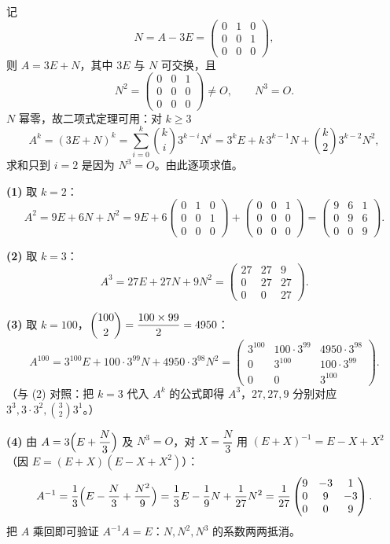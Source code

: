 \begin{solution}
记
\[
N=A-3E=\begin{pmatrix}0&1&0\\0&0&1\\0&0&0\end{pmatrix},
\]
则 $A=3E+N$，其中 $3E$ 与 $N$ 可交换，且
\[
N^{2}=\begin{pmatrix}0&0&1\\0&0&0\\0&0&0\end{pmatrix}\ne O,\qquad N^{3}=O .
\]
$N$ 幂零，故二项式定理可用：对 $k\ge3$
\[
A^{k}=(3E+N)^{k}=\sum_{i=0}^{k}\binom{k}{i}3^{k-i}N^{i}
=3^{k}E+k\,3^{k-1}N+\binom{k}{2}3^{k-2}N^{2},
\]
求和只到 $i=2$ 是因为 $N^{3}=O$。由此逐项求值。

\textbf{(1)} 取 $k=2$：
\[
A^{2}=9E+6N+N^{2}=9E+6\begin{pmatrix}0&1&0\\0&0&1\\0&0&0\end{pmatrix}+\begin{pmatrix}0&0&1\\0&0&0\\0&0&0\end{pmatrix}
=\begin{pmatrix}9&6&1\\0&9&6\\0&0&9\end{pmatrix}.
\]

\textbf{(2)} 取 $k=3$：
\[
A^{3}=27E+27N+9N^{2}=\begin{pmatrix}27&27&9\\0&27&27\\0&0&27\end{pmatrix}.
\]

\textbf{(3)} 取 $k=100$，$\dbinom{100}{2}=\dfrac{100\times99}{2}=4950$：
\[
A^{100}=3^{100}E+100\cdot3^{99}N+4950\cdot3^{98}N^{2}
=\begin{pmatrix}3^{100}&100\cdot3^{99}&4950\cdot3^{98}\\0&3^{100}&100\cdot3^{99}\\0&0&3^{100}\end{pmatrix}.
\]
（与 (2) 对照：把 $k=3$ 代入 $A^{k}$ 的公式即得 $A^{3}$，$27,27,9$ 分别对应 $3^{3},3\cdot3^{2},\binom{3}{2}3^{1}$。）

\textbf{(4)} 由 $A=3\Bigl(E+\dfrac{N}{3}\Bigr)$ 及 $N^{3}=O$，对 $X=\dfrac{N}{3}$ 用 $(E+X)^{-1}=E-X+X^{2}$（因 $E=(E+X)(E-X+X^{2})$）：
\[
A^{-1}=\frac13\Bigl(E-\frac{N}{3}+\frac{N^{2}}{9}\Bigr)
=\frac13E-\frac19N+\frac1{27}N^{2}
=\frac{1}{27}\begin{pmatrix}9&-3&1\\0&9&-3\\0&0&9\end{pmatrix}.
\]
把 $A$ 乘回即可验证 $A^{-1}A=E$：$N,N^{2},N^{3}$ 的系数两两抵消。


\end{solution}
